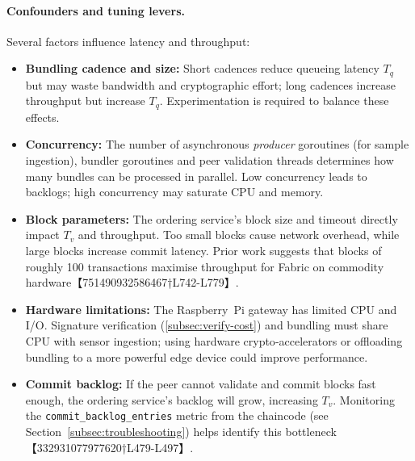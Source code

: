 \documentclass[12pt,onecolumn]{IEEEtran} %
\begin{document}
\paragraph{Confounders and tuning levers.}  Several factors influence latency
and throughput:
\begin{itemize}
  \item \textbf{Bundling cadence and size:} Short cadences reduce queueing
    latency $T_q$ but may waste bandwidth and cryptographic effort; long
    cadences increase throughput but increase $T_q$.  Experimentation is
    required to balance these effects.
  \item \textbf{Concurrency:} The number of asynchronous \emph{producer}
    goroutines (for sample ingestion), bundler goroutines and peer validation
    threads determines how many bundles can be processed in parallel.  Low
    concurrency leads to backlogs; high concurrency may saturate CPU and memory.
  \item \textbf{Block parameters:} The ordering service’s block size and
    timeout directly impact $T_v$ and throughput.  Too small blocks cause
    network overhead, while large blocks increase commit latency.  Prior work
    suggests that blocks of roughly 100 transactions maximise throughput for
    Fabric on commodity hardware【751490932586467†L742-L779】.
  \item \textbf{Hardware limitations:} The Raspberry~Pi gateway has limited
    CPU and I/O.  Signature verification (\autoref{subsec:verify-cost}) and
    bundling must share CPU with sensor ingestion; using hardware
    crypto‑accelerators or offloading bundling to a more powerful edge device
    could improve performance.
  \item \textbf{Commit backlog:} If the peer cannot validate and commit
    blocks fast enough, the ordering service’s backlog will grow, increasing
    $T_v$.  Monitoring the \texttt{commit\_backlog\_entries} metric
    from the chaincode (see Section~\ref{subsec:troubleshooting}) helps
    identify this bottleneck【332931077977620†L479-L497】.
\end{itemize}
\end{document}

